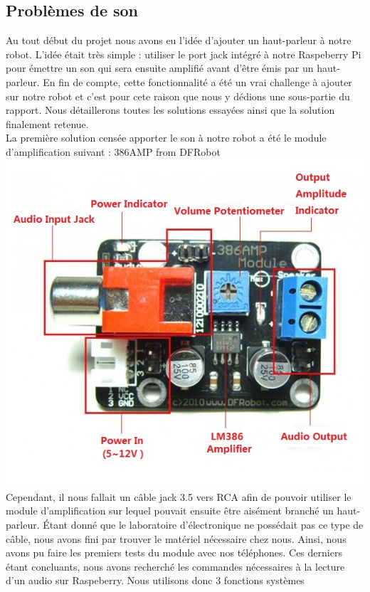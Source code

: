 \documentclass[a4paper, 12pt]{report}
\begin{document}
\subsection{Problèmes de son}
Au tout début du projet nous avons eu l'idée d'ajouter un haut-parleur à notre robot. L'idée était très simple : utiliser le port jack intégré à notre Raspeberry Pi pour émettre un son qui sera ensuite amplifié avant d'être émis par un haut-parleur. En fin de compte, cette fonctionnalité a été un vrai challenge à ajouter sur notre robot et c'est pour cete raison que nous y dédions une sous-partie du rapport. Nous détaillerons toutes les solutions essayées ainsi que la solution finalement retenue.
\\
La première solution censée apporter le son à notre robot a été le module d'amplification suivant : 386AMP from DFRobot
\\
\includegraphics[scale=0.5]{386AMP.jpg}
\\
Cependant, il nous fallait un câble jack 3.5 vers RCA afin de pouvoir utiliser le module d'amplification sur lequel pouvait ensuite être aisément branché un haut-parleur. Étant donné que le laboratoire d'électronique ne possédait pas ce type de câble, nous avons fini par trouver le matériel nécessaire chez nous. Ainsi, nous avons pu faire les premiers tests du module avec nos téléphones. Ces derniers étant concluants, nous avons recherché les commandes nécessaires à la lecture d'un audio sur Raspeberry. Nous utilisons donc 3 fonctions systèmes
\end{document}
